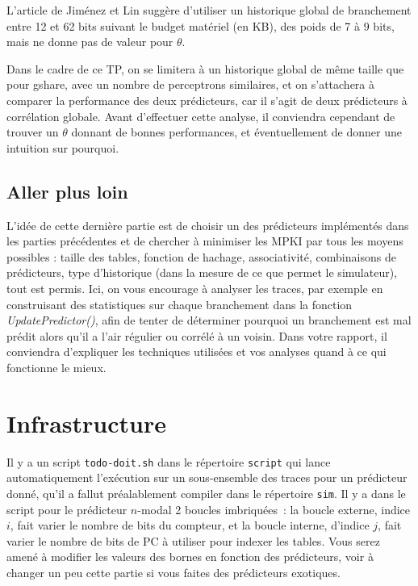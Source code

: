 \documentclass[a4paper]{article}
\begin{document}
L'article de Jiménez et Lin suggère d'utiliser un historique global de branchement entre 12 et 62 bits suivant le budget matériel (en KB), des poids de 7 à 9 bits, mais ne donne pas de valeur pour $\theta$.

Dans le cadre de ce TP, on se limitera à un historique global de même taille que pour gshare, avec un nombre de perceptrons similaires, et on s'attachera à comparer la performance des deux prédicteurs, car il s'agit de deux prédicteurs à corrélation globale. Avant d'effectuer cette analyse, il conviendra cependant de trouver un $\theta$ donnant de bonnes performances, et éventuellement de donner une intuition sur pourquoi. 



\subsection{Aller plus loin}

L'idée de cette dernière partie est de choisir un des prédicteurs implémentés dans les parties précédentes et de chercher à minimiser les MPKI par tous les moyens possibles : taille des tables, fonction de hachage, associativité, combinaisons de prédicteurs, type d'historique (dans la mesure de ce que permet le simulateur), tout est permis. Ici, on vous encourage à analyser les traces, par exemple en construisant des statistiques sur chaque branchement dans la fonction \textit{UpdatePredictor()}, afin de tenter de déterminer pourquoi un branchement est mal prédit alors qu'il a l'air régulier ou corrélé à un voisin. Dans votre rapport, il conviendra d'expliquer les techniques utilisées et vos analyses quand à ce qui fonctionne le mieux.

\section{Infrastructure}

Il y a un script \verb+todo-doit.sh+ dans le répertoire \verb+script+ qui lance automatiquement l'exécution sur un sous-ensemble des traces pour un prédicteur donné, qu'il a fallut préalablement compiler dans le répertoire \verb+sim+.
Il y a dans le script pour le prédicteur $n$-modal 2 boucles imbriquées~: la boucle externe, indice $i$, fait varier le nombre de bits du compteur, et la boucle interne, d'indice $j$, fait varier le nombre de bits de PC à utiliser pour indexer les tables.
Vous serez amené à modifier les valeurs des bornes en fonction des prédicteurs, voir à changer un peu cette partie si vous faites des prédicteurs exotiques.
\end{document}
